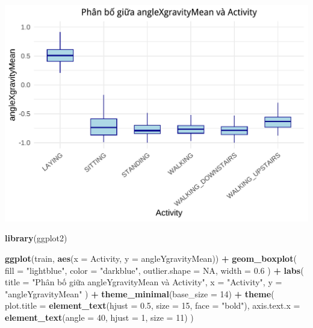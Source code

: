 \documentclass[
]{article}
\newenvironment{Shaded}{\begin{snugshade}}{\end{snugshade}}
\newcommand{\AttributeTok}[1]{\textcolor[rgb]{0.13,0.29,0.53}{#1}}
\newcommand{\ConstantTok}[1]{\textcolor[rgb]{0.56,0.35,0.01}{#1}}
\newcommand{\DecValTok}[1]{\textcolor[rgb]{0.00,0.00,0.81}{#1}}
\newcommand{\FloatTok}[1]{\textcolor[rgb]{0.00,0.00,0.81}{#1}}
\newcommand{\FunctionTok}[1]{\textcolor[rgb]{0.13,0.29,0.53}{\textbf{#1}}}
\newcommand{\NormalTok}[1]{#1}
\newcommand{\SpecialCharTok}[1]{\textcolor[rgb]{0.81,0.36,0.00}{\textbf{#1}}}
\newcommand{\StringTok}[1]{\textcolor[rgb]{0.31,0.60,0.02}{#1}}
\begin{document}
\includegraphics{report_files/figure-latex/unnamed-chunk-20-1.pdf}

\begin{Shaded}
\begin{Highlighting}[]
\FunctionTok{library}\NormalTok{(ggplot2)}

\FunctionTok{ggplot}\NormalTok{(train, }\FunctionTok{aes}\NormalTok{(}\AttributeTok{x =}\NormalTok{ Activity, }\AttributeTok{y =}\NormalTok{ angleYgravityMean)) }\SpecialCharTok{+}
  \FunctionTok{geom\_boxplot}\NormalTok{(}
    \AttributeTok{fill =} \StringTok{"lightblue"}\NormalTok{,}
    \AttributeTok{color =} \StringTok{"darkblue"}\NormalTok{,}
    \AttributeTok{outlier.shape =} \ConstantTok{NA}\NormalTok{,}
    \AttributeTok{width =} \FloatTok{0.6}
\NormalTok{  ) }\SpecialCharTok{+}
  \FunctionTok{labs}\NormalTok{(}
    \AttributeTok{title =} \StringTok{"Phân bố giữa angleYgravityMean và Activity"}\NormalTok{,}
    \AttributeTok{x =} \StringTok{"Activity"}\NormalTok{,}
    \AttributeTok{y =} \StringTok{"angleYgravityMean"}
\NormalTok{  ) }\SpecialCharTok{+}
  \FunctionTok{theme\_minimal}\NormalTok{(}\AttributeTok{base\_size =} \DecValTok{14}\NormalTok{) }\SpecialCharTok{+}
  \FunctionTok{theme}\NormalTok{(}
    \AttributeTok{plot.title =} \FunctionTok{element\_text}\NormalTok{(}\AttributeTok{hjust =} \FloatTok{0.5}\NormalTok{, }\AttributeTok{size =} \DecValTok{15}\NormalTok{, }\AttributeTok{face =} \StringTok{"bold"}\NormalTok{),}
    \AttributeTok{axis.text.x =} \FunctionTok{element\_text}\NormalTok{(}\AttributeTok{angle =} \DecValTok{40}\NormalTok{, }\AttributeTok{hjust =} \DecValTok{1}\NormalTok{, }\AttributeTok{size =} \DecValTok{11}\NormalTok{)}
\NormalTok{  )}
\end{Highlighting}
\end{Shaded}
\end{document}
